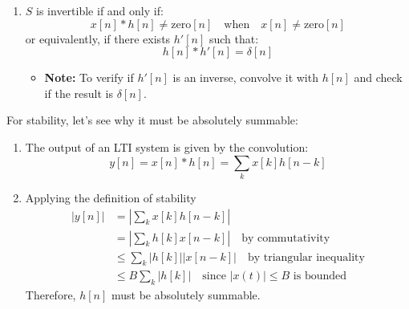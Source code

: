 \begin{theorem}
\begin{enumerate}
        \item $S$ is invertible if and only if:
        \[
        x[n] * h[n] \neq \text{zero}[n] \quad \text{when} \quad x[n] \neq \text{zero}[n]
        \]
        or equivalently, if there exists $h'[n]$ such that:
        \[
        h[n] * h'[n] = \delta[n]
        \]
        \begin{itemize}
            \item \textbf{Note:} To verify if $h'[n]$ is an inverse, convolve it with $h[n]$ and check if the result is $\delta[n]$.
        \end{itemize}
    \end{enumerate}
\end{theorem}

\begin{derivation}
    For stability, let's see why it must be absolutely summable:
    \begin{enumerate}
        \item The output of an LTI system is given by the convolution:
        \[
        y[n] = x[n] * h[n] = \sum_{k} x[k] h[n - k]
        \]
        \item Applying the definition of stability 
        \begin{align*}
            |y[n]| &= \left| \sum_{k} x[k] h[n - k] \right| \\
            &= \left| \sum_{k} h[k] x[n - k] \right| \quad \text{by commutativity} \\
            &\leq \sum_{k} |h[k]| |x[n - k]| \quad \text{by triangular inequality} \\
            &\leq B \sum_{k} |h[k]| \quad \text{since } |x(t)| \leq B \text{ is bounded}
        \end{align*}
        Therefore, $h[n]$ must be absolutely summable. 
    \end{enumerate}
\end{derivation}